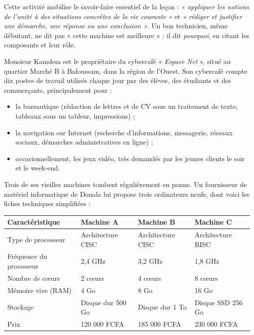 \documentclass[11pt]{article}
\newcounter{popsec}
\newcounter{popsub}
\newcommand{\courssub}[1]{%
  \stepcounter{popsub}%
  \par\vspace{9pt}\noindent{\popxbold\fontsize{11.5}{13}\selectfont\color{popink}{\color{poporange}\thepopsec.\thepopsub}\hspace{6pt}#1}\par\nopagebreak\vspace{4pt}
}
\begin{document}
\begin{aretenir}
Cette activité mobilise le savoir-faire essentiel de la leçon : \emph{« appliquer les notions de l'unité à des situations concrètes de la vie courante »} et \emph{« rédiger et justifier une démarche, une réponse ou une conclusion »}. Un bon technicien, même débutant, ne dit pas « cette machine est meilleure » : il dit \emph{pourquoi}, en citant les composants et leur rôle.
\end{aretenir}

\courssub{Situation}

Monsieur Kamdem est le propriétaire du cybercafé « \emph{Espace Net} », situé au quartier Marché B à Bafoussam, dans la région de l'Ouest. Son cybercafé compte dix postes de travail utilisés chaque jour par des élèves, des étudiants et des commerçants, principalement pour :

\begin{itemize}
\item la bureautique (rédaction de lettres et de CV sous un traitement de texte, tableaux sous un tableur, impressions) ;
\item la navigation sur Internet (recherche d'informations, messagerie, réseaux sociaux, démarches administratives en ligne) ;
\item occasionnellement, les jeux vidéo, très demandés par les jeunes clients le soir et le week-end.
\end{itemize}

Trois de ses vieilles machines tombent régulièrement en panne. Un fournisseur de matériel informatique de Douala lui propose trois ordinateurs neufs, dont voici les fiches techniques simplifiées :

\begin{center}
\begin{tabularx}{\linewidth}{|l|X|X|X|}
\hline
\rowcolor{popblueL} \textbf{Caractéristique} & \textbf{Machine A} & \textbf{Machine B} & \textbf{Machine C} \\
\hline
Type de processeur & Architecture CISC & Architecture CISC & Architecture RISC \\
\hline
Fréquence du processeur & 2,4 GHz & 3,2 GHz & 1,8 GHz \\
\hline
Nombre de cœurs & 2 cœurs & 4 cœurs & 8 cœurs \\
\hline
Mémoire vive (RAM) & 4 Go & 8 Go & 16 Go \\
\hline
Stockage & Disque dur 500 Go & Disque dur 1 To & Disque SSD 256 Go \\
\hline
Prix & 120 000 FCFA & 185 000 FCFA & 230 000 FCFA \\
\hline
\end{tabularx}
\end{center}
\end{document}
